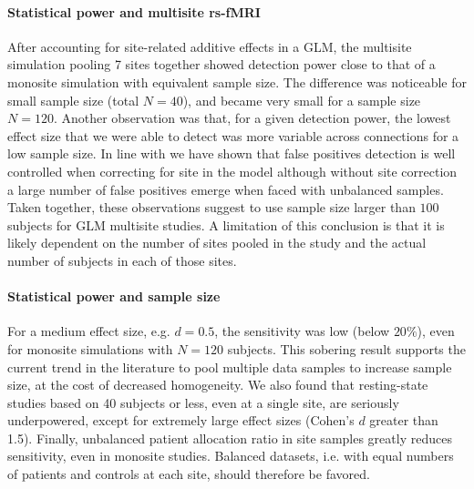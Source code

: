 \documentclass[authoryear]{elsarticle}
\begin{document}
\paragraph{Statistical power and multisite rs-fMRI} After accounting for site-related additive effects in a GLM, the multisite simulation pooling 7 sites together showed detection power close to that of a monosite simulation with equivalent sample size. The difference was noticeable for small sample size (total $N=40$), and became very small for a sample size $N=120$. Another observation was that, for a given detection power, the lowest effect size that we were able to detect was more variable across connections for a low sample size. In line with \cite{Eklund2016} we have shown that false positives detection is well controlled when correcting for site in the model although without site correction a large number of false positives emerge when faced with unbalanced samples. Taken together, these observations suggest to use sample size larger than $100$ subjects for GLM multisite studies. A limitation of this conclusion is that it is likely dependent on the number of sites pooled in the study and the actual number of subjects in each of those sites. 

\paragraph{Statistical power and sample size} For a medium effect size, e.g. $d=0.5$, the sensitivity was low (below $20\%$), even for monosite simulations with $N=120$ subjects. This sobering result supports the current trend in the literature to pool multiple data samples to increase sample size, at the cost of decreased homogeneity. We also found that resting-state studies based on 40 subjects or less, even at a single site, are seriously underpowered, except for extremely large effect sizes (Cohen's $d$ greater than 1.5). Finally, unbalanced patient allocation ratio in site samples greatly reduces sensitivity, even in monosite studies. Balanced datasets, i.e. with equal numbers of patients and controls at each site, should therefore be favored. 
\end{document}
